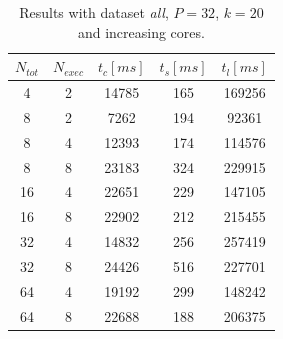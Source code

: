 \documentclass[a4paper, 11pt]{article}
\begin{document}
\bgroup
\vspace{0pt}
\def\arraystretch{0.9}%
\begin{footnotesize}
	\begin{table}[!htb]
		\centering
		\vspace{10pt}
		\parbox[t]{.45\linewidth}{
		\begin{tabular}{c|c|c|c|c} 
			\hline
			\textbf{$N_{tot}$} & \textbf{$N_{exec}$} & \textbf{$t_c [ms]$} & \textbf{$t_s [ms]$} & \textbf{$t_l [ms]$} \\
			\hline
			4 & 2 & 14785 & 165 & 169256\\ 
			8 & 2 & 7262 & 194 & 92361 \\
			8 & 4 & 12393 & 174 & 114576\\
			8 & 8 & 23183 & 324 & 229915\\
			16 & 4 & 22651 & 229 & 147105\\
			16 & 8 & 22902 & 212 & 215455\\
			32 & 4 & 14832 & 256 & 257419\\
			32 & 8 & 24426 & 516 & 227701\\
			64 & 4 & 19192 & 299 & 148242\\
			64 & 8 & 22688& 188 & 206375\\
			\hline
		\end{tabular}
		\caption{Results with dataset \textit{all}, $P=32$, $k=20$  and increasing cores.}\label{table:a}
		}
	\end{table}
\end{footnotesize}
\egroup
\bgroup
\vspace{0pt}
\def\arraystretch{0.9}%
\end{document}
